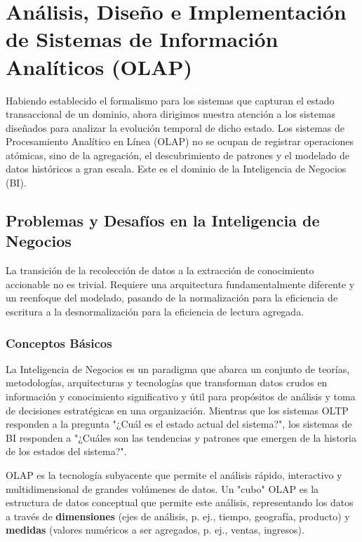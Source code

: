 \documentclass{article}
\newenvironment{definition}[1][Definición]{\begin{trivlist}
\item[\hskip \labelsep {\bfseries #1}]}{\end{trivlist}}
\begin{document}
\chapter{Análisis, Diseño e Implementación de Sistemas de Información Analíticos (OLAP)}

Habiendo establecido el formalismo para los sistemas que capturan el estado transaccional de un dominio, ahora dirigimos nuestra atención a los sistemas diseñados para analizar la evolución temporal de dicho estado. Los sistemas de Procesamiento Analítico en Línea (OLAP) no se ocupan de registrar operaciones atómicas, sino de la agregación, el descubrimiento de patrones y el modelado de datos históricos a gran escala. Este es el dominio de la Inteligencia de Negocios (BI).

\section{Problemas y Desafíos en la Inteligencia de Negocios}
La transición de la recolección de datos a la extracción de conocimiento accionable no es trivial. Requiere una arquitectura fundamentalmente diferente y un reenfoque del modelado, pasando de la normalización para la eficiencia de escritura a la desnormalización para la eficiencia de lectura agregada.

\subsection{Conceptos Básicos}
\begin{definition}[Inteligencia de Negocios (BI)]
La Inteligencia de Negocios es un paradigma que abarca un conjunto de teorías, metodologías, arquitecturas y tecnologías que transforman datos crudos en información y conocimiento significativo y útil para propósitos de análisis y toma de decisiones estratégicas en una organización. Mientras que los sistemas OLTP responden a la pregunta "¿Cuál es el estado actual del sistema?", los sistemas de BI responden a "¿Cuáles son las tendencias y patrones que emergen de la historia de los estados del sistema?".
\end{definition}

\begin{definition}[Procesamiento Analítico en Línea (OLAP)]
OLAP es la tecnología subyacente que permite el análisis rápido, interactivo y multidimensional de grandes volúmenes de datos. Un "cubo" OLAP es la estructura de datos conceptual que permite este análisis, representando los datos a través de \textbf{dimensiones} (ejes de análisis, p. ej., tiempo, geografía, producto) y \textbf{medidas} (valores numéricos a ser agregados, p. ej., ventas, ingresos).
\end{definition}
\end{document}
